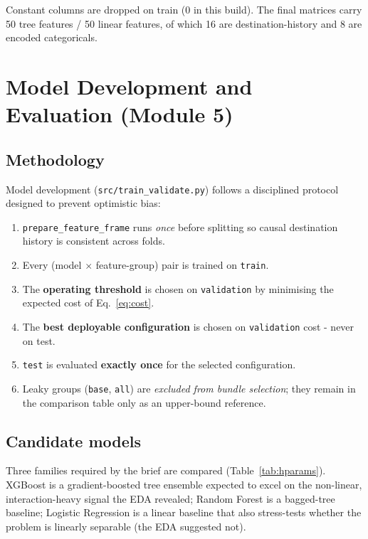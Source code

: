 \documentclass[11pt,a4paper]{report}
\newcommand{\code}[1]{\texttt{\small #1}}
\begin{document}
Constant columns are dropped on train (0 in this build). The final matrices carry 50 tree
features / 50 linear features, of which 16 are destination-history and 8 are encoded
categoricals.

\chapter{Model Development and Evaluation (Module 5)}
\label{ch:m5}

\section{Methodology}

Model development (\code{src/train\_validate.py}) follows a disciplined protocol designed to
prevent optimistic bias:

\begin{enumerate}[nosep,leftmargin=1.6em]
  \item \code{prepare\_feature\_frame} runs \emph{once} before splitting so causal
        destination history is consistent across folds.
  \item Every (model $\times$ feature-group) pair is trained on \code{train}.
  \item The \textbf{operating threshold} is chosen on \code{validation} by minimising the
        expected cost of Eq.~\eqref{eq:cost}.
  \item The \textbf{best deployable configuration} is chosen on \code{validation} cost -
        never on test.
  \item \code{test} is evaluated \textbf{exactly once} for the selected configuration.
  \item Leaky groups (\code{base}, \code{all}) are \emph{excluded from bundle selection};
        they remain in the comparison table only as an upper-bound reference.
\end{enumerate}

\section{Candidate models}

Three families required by the brief are compared (Table~\ref{tab:hparams}). XGBoost is a
gradient-boosted tree ensemble expected to excel on the non-linear, interaction-heavy signal
the EDA revealed; Random Forest is a bagged-tree baseline; Logistic Regression is a linear
baseline that also stress-tests whether the problem is linearly separable (the EDA suggested
not).
\end{document}
